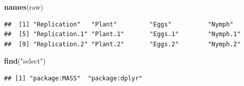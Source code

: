 \documentclass[
]{article}
\newenvironment{Shaded}{\begin{snugshade}}{\end{snugshade}}
\newcommand{\FunctionTok}[1]{\textcolor[rgb]{0.13,0.29,0.53}{\textbf{#1}}}
\newcommand{\NormalTok}[1]{#1}
\newcommand{\StringTok}[1]{\textcolor[rgb]{0.31,0.60,0.02}{#1}}
\begin{document}
\begin{Shaded}
\begin{Highlighting}[]
\FunctionTok{names}\NormalTok{(raw)}
\end{Highlighting}
\end{Shaded}

\begin{verbatim}
##  [1] "Replication"   "Plant"         "Eggs"          "Nymph"        
##  [5] "Replication.1" "Plant.1"       "Eggs.1"        "Nymph.1"      
##  [9] "Replication.2" "Plant.2"       "Eggs.2"        "Nymph.2"
\end{verbatim}

\begin{Shaded}
\begin{Highlighting}[]
\FunctionTok{find}\NormalTok{(}\StringTok{"select"}\NormalTok{)}
\end{Highlighting}
\end{Shaded}

\begin{verbatim}
## [1] "package:MASS"  "package:dplyr"
\end{verbatim}
\end{document}

